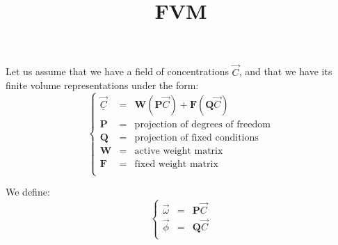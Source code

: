 \documentclass[aps,onecolumn,11pt]{revtex4}
\newcommand{\mat}[1]{\bm{#1}}
\begin{document}
\title{FVM}
\maketitle

Let us assume that we have a field of concentrations $\vec{C}$,
and that we have its finite volume representations under the form:
\begin{equation}
\left\lbrace
\begin{array}{rcl}
	\vec{\underline{C}} & = & \mat{W} \left(\mat{P}\vec{C}\right) + \mat{F} \left(\mat{Q}\vec{C}\right)\\
	\mat{P} & = & \text{projection of degrees of freedom}\\
	\mat{Q} & = & \text{projection of fixed conditions}\\
	\mat{W} & = & \text{active weight matrix}\\
	\mat{F} & = & \text{fixed weight matrix}\\
\end{array}
\right.
\end{equation}

We define:
\begin{equation}
\left\lbrace
\begin{array}{rcl}
	\vec{\omega} & = & \mat{P}\vec{C}\\
	\vec{\phi}   & = & \mat{Q}\vec{C}\\
\end{array}
\right.
\end{equation}
\end{document}
